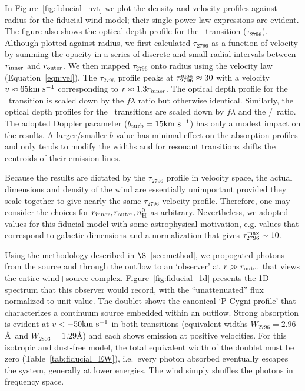 \documentclass[12pt,preprint]{aastex}
\begin{document}
In Figure~\ref{fig:fiducial_nvt} we plot the density and velocity
profiles against radius for the fiducial wind model;  
their single power-law expressions are evident.  The figure also
shows the optical depth profile for the \mgiia\ transition ($\tau_{2796}$).
Although plotted against radius, we first calculated $\tau_{2796}$ 
as a function of velocity by summing the opacity in a series of
discrete and small radial intervals
between $r_{\rm inner}$  and $r_{\rm outer}$.   We then mapped
$\tau_{2796}$ onto radius using the velocity law
(Equation~\ref{eqn:vel}). 
The $\tau_{2796}$ profile peaks at $\tau_{2796}^{\rm max} \approx 30$
with a velocity $v \approx 65 {\rm km~s^{-1}}$ corresponding to $r \approx 1.3
r_{\rm inner}$.  The optical depth profile for the \mgiib\ transition
is scaled down by the $f\lambda$ ratio but otherwise identical.  Similarly,
the optical depth profiles for the \feiid\ transitions are
scaled down by $f \lambda$ and the \nfe/\nmg\ ratio.  
The adopted Doppler parameter
($b_{\rm turb} = 15 {\rm km~s^{-1}}$) has only a modest impact on the results.
A larger/smaller $b$-value has minimal effect on the absorption
profiles and only tends to modify the widths and for resonant
transitions shifts the centroids of their emission lines.

Because the results are dictated by the $\tau_{2796}$ profile in
velocity space, the actual dimensions and density of the wind are
essentially unimportant provided they scale together to give nearly the same
$\tau_{2796}$ velocity profile.  Therefore, one may consider the choices for
$r_{\rm inner}, r_{\rm outer}, n_{\rm H}^0$ as arbitrary.
Nevertheless, we adopted values for this fiducial model with
some astrophysical motivation,  e.g. values that correspond to
galactic dimensions and a normalization that gives $\tau_{2796}^{\rm
  max} \sim 10$.


Using the methodology described in $\S$~\ref{sec:method}, we
propogated photons from the source and through the outflow to an
`observer' at $r \gg r_{\rm outer}$ that views the entire wind+source
complex.  Figure~\ref{fig:fiducial_1d} presents the 1D spectrum
that this observer would record, with the ``unattenuated'' flux
normalized to unit value.   The  doublet
shows the canonical `P-Cygni profile' that characterizes a continuum
source embedded within an outflow.  Strong absorption is evident at
$v < -50 {\rm km~s^{-1}}$ in both transitions (equivalent widths $W_{2796} =
2.96$\AA\ and $W_{2803} = 1.29$\AA) and each shows emission at
positive velocities.  For this isotropic and dust-free model, the
total equivalent width of the doublet must be zero
(Table~\ref{tab:fiducial_EW}), i.e.\ every photon
absorbed eventually escapes the system, generally at lower
energies.  The wind simply shuffles the photons in frequency space.
\end{document}
